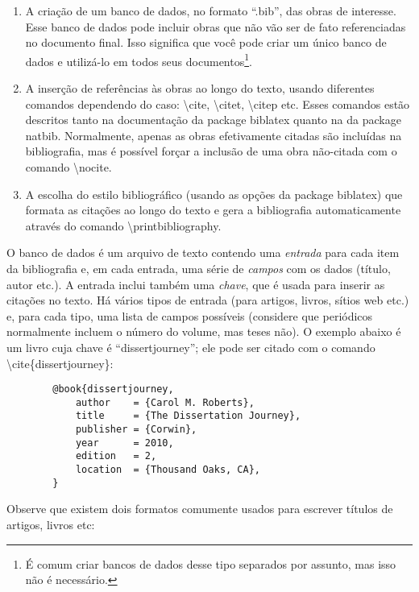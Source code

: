 \begin{enumerate}
\item A criação de um banco de dados, no formato ``.bib'', das obras de
interesse. Esse banco de dados pode incluir obras que não vão ser de fato
referenciadas no documento final. Isso significa que você pode criar um
único banco de dados e utilizá-lo em todos seus documentos\footnote{É
comum criar bancos de dados desse tipo separados por assunto, mas isso
não é necessário.}.

\item A inserção de referências às obras ao longo do texto, usando
diferentes comandos dependendo do caso: \textsf{\textbackslash{}cite},
\textsf{\textbackslash{}citet}, \textsf{\textbackslash{}citep} etc. Esses
comandos estão descritos tanto na documentação da package
biblatex quanto na da package natbib.
Normalmente, apenas as obras efetivamente citadas são incluídas na
bibliografia, mas é possível forçar a inclusão de uma obra não-citada
com o comando \textsf{\textbackslash{}nocite}.

\item A escolha do estilo bibliográfico (usando as opções da package
biblatex) que formata as citações ao longo do texto e gera a bibliografia
automaticamente através do comando \textsf{\textbackslash{}printbibliography}.
\end{enumerate}

O banco de dados é um arquivo de texto contendo uma \emph{entrada} para cada
item da bibliografia e, em cada entrada, uma série de \emph{campos} com os
dados (título, autor etc.). A entrada inclui também uma \emph{chave}, que é
usada para inserir as citações no texto. Há vários tipos de entrada (para
artigos, livros, sítios web etc.) e, para cada tipo, uma lista de campos
possíveis (considere que periódicos normalmente incluem o número do volume,
mas teses não). O exemplo abaixo é um livro cuja chave é ``dissertjourney'';
ele pode ser citado com o comando \textsf{\textbackslash{}cite\{dissertjourney\}}:

\begin{verbatim}
        @book{dissertjourney,
            author    = {Carol M. Roberts},
            title     = {The Dissertation Journey},
            publisher = {Corwin},
            year      = 2010,
            edition   = 2,
            location  = {Thousand Oaks, CA},
        }
\end{verbatim}

Observe que existem dois formatos comumente usados para escrever títulos
de artigos, livros etc:

